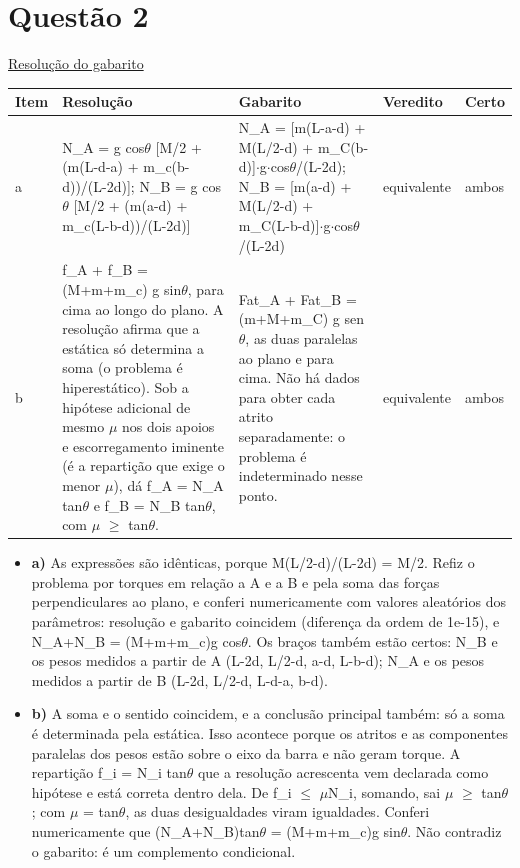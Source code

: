 \documentclass{article}%
\begin{document}
\section*{Questão 2}%
\href{https://poliedroresolve.sistemapoliedro.com.br/vestibulares/ita/2026/ita-2-fase-dia-3-30-10-2025-2-fase-dia-3/dissertativa-2-fisica-2-fase-dia-3-ita-2026}{Resolução do gabarito}\par\smallskip%
\begin{longtable}{@{}p{} p{} p{} p{} p{}@{}}\toprule Item & Resolução & Gabarito & Veredito & Certo \\ \midrule
a & N\_A = g cos$\theta$ {[}M/2 + (m(L-d-a) + m\_c(b-d))/(L-2d){]}; N\_B = g cos$\theta$ {[}M/2 + (m(a-d) + m\_c(L-b-d))/(L-2d){]} & N\_A = {[}m(L-a-d) + M(L/2-d) + m\_C(b-d){]}$\cdot$g$\cdot$cos$\theta$/(L-2d); N\_B = {[}m(a-d) + M(L/2-d) + m\_C(L-b-d){]}$\cdot$g$\cdot$cos$\theta$/(L-2d) & equivalente & ambos \\
b & f\_A + f\_B = (M+m+m\_c) g sin$\theta$, para cima ao longo do plano. A resolução afirma que a estática só determina a soma (o problema é hiperestático). Sob a hipótese adicional de mesmo $\mu$ nos dois apoios e escorregamento iminente (é a repartição que exige o menor $\mu$), dá f\_A = N\_A tan$\theta$ e f\_B = N\_B tan$\theta$, com $\mu$ $\geq$ tan$\theta$. & Fat\_A + Fat\_B = (m+M+m\_C) g sen$\theta$, as duas paralelas ao plano e para cima. Não há dados para obter cada atrito separadamente: o problema é indeterminado nesse ponto. & equivalente & ambos \\
\bottomrule\end{longtable}%
\begin{itemize}%
\item%
\textbf{a)} As expressões são idênticas, porque M(L/2-d)/(L-2d) = M/2. Refiz o problema por torques em relação a A e a B e pela soma das forças perpendiculares ao plano, e conferi numericamente com valores aleatórios dos parâmetros: resolução e gabarito coincidem (diferença da ordem de 1e{-}15), e N\_A+N\_B = (M+m+m\_c)g cos$\theta$. Os braços também estão certos: N\_B e os pesos medidos a partir de A (L-2d, L/2-d, a-d, L-b-d); N\_A e os pesos medidos a partir de B (L-2d, L/2-d, L-d-a, b-d).%
\item%
\textbf{b)} A soma e o sentido coincidem, e a conclusão principal também: só a soma é determinada pela estática. Isso acontece porque os atritos e as componentes paralelas dos pesos estão sobre o eixo da barra e não geram torque. A repartição f\_i = N\_i tan$\theta$ que a resolução acrescenta vem declarada como hipótese e está correta dentro dela. De f\_i $\leq$ $\mu$N\_i, somando, sai $\mu$ $\geq$ tan$\theta$; com $\mu$ = tan$\theta$, as duas desigualdades viram igualdades. Conferi numericamente que (N\_A+N\_B)tan$\theta$ = (M+m+m\_c)g sin$\theta$. Não contradiz o gabarito: é um complemento condicional.%
\end{itemize}%
\end{document}
